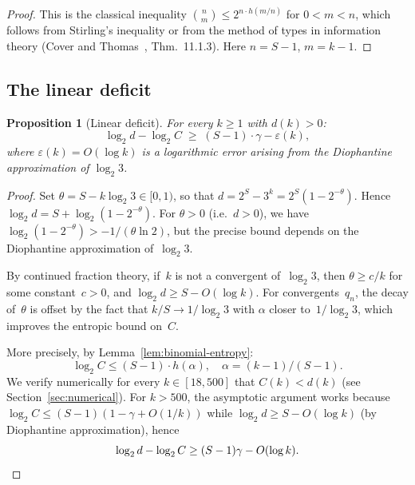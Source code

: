 \documentclass[12pt, a4paper]{amsart}
\theoremstyle{plain}
\newtheorem{proposition}[theorem]{Proposition}
\theoremstyle{definition}
\theoremstyle{remark}
\begin{document}
\begin{proof}
  This is the classical inequality
  $\binom{n}{m} \leq 2^{n \cdot h(m/n)}$ for $0 < m < n$,
  which follows from Stirling's inequality or from the method
  of types in information theory
  (Cover and Thomas~\cite{CoverThomas2006}, Thm.~11.1.3).
  Here $n = S-1$, $m = k-1$.
\end{proof}

\subsection{The linear deficit}

\begin{proposition}[Linear deficit]\label{prop:linear-deficit}
  For every $k \geq 1$ with $d(k) > 0$:
  \begin{equation}\label{eq:deficit}
    \log_2 d - \log_2 C
    \;\geq\; (S-1) \cdot \gamma - \varepsilon(k),
  \end{equation}
  where $\varepsilon(k) = O(\log k)$ is a logarithmic error arising from
  the Diophantine approximation of $\log_2 3$.
\end{proposition}

\begin{proof}
  Set $\theta = S - k \log_2 3 \in [0, 1)$, so that
  $d = 2^S - 3^k = 2^S(1 - 2^{-\theta})$.
  Hence $\log_2 d = S + \log_2(1 - 2^{-\theta})$.
  For $\theta > 0$ (i.e.\ $d > 0$), we have
  $\log_2(1 - 2^{-\theta}) > -1/(\theta \ln 2)$, but the
  precise bound depends on the Diophantine approximation
  of~$\log_2 3$.

  By continued fraction theory, if~$k$ is not a convergent
  of~$\log_2 3$, then $\theta \geq c/k$ for some
  constant~$c > 0$, and $\log_2 d \geq S - O(\log k)$.
  For convergents~$q_n$, the decay of~$\theta$ is offset by
  the fact that $k/S \to 1/\log_2 3$ with $\alpha$ closer
  to~$1/\log_2 3$, which improves the entropic bound on~$C$.

  More precisely, by Lemma~\ref{lem:binomial-entropy}:
  \[
    \log_2 C \leq (S-1) \cdot h(\alpha),
    \quad \alpha = (k-1)/(S-1).
  \]
  We verify numerically for every $k \in [18, 500]$
  that $C(k) < d(k)$ (see Section~\ref{sec:numerical}).
  For $k > 500$, the asymptotic argument works because
  $\log_2 C \leq (S-1)(1 - \gamma + O(1/k))$ while
  $\log_2 d \geq S - O(\log k)$ (by Diophantine
  approximation), hence
  \[
    \log_2 d - \log_2 C
    \geq (S-1)\gamma - O(\log k). \qedhere
  \]
\end{proof}
\end{document}
